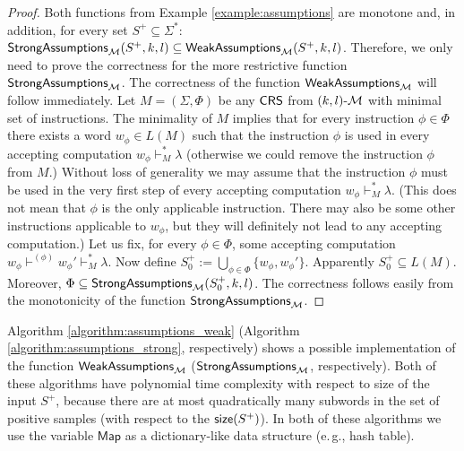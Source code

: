 \begin{proof}
Both functions from Example \ref{example:assumptions} are monotone and, in addition, for every set $S^+ \subseteq \Sigma^*$: $\textup{\sf StrongAssumptions}_{\textup{\sf $\mathcal{M}$}}(S^+,k,l) \subseteq \textup{\sf WeakAssumptions}_{\textup{\sf $\mathcal{M}$}}(S^+,k,l)$. Therefore, we only need to prove the correctness for the more restrictive function $\textup{\sf StrongAssumptions}_{\textup{\sf $\mathcal{M}$}}$. The correctness of the function $\textup{\sf WeakAssumptions}_{\textup{\sf $\mathcal{M}$}}$ will follow immediately. Let $M = (\Sigma, \Phi)$ be any $\textup{\sf CRS\/}$ from $\textup{\sf $(k,l)$-\textup{\sf $\mathcal{M}$}}$ with minimal set of instructions. The minimality of $M$ implies that for every instruction $\phi \in \Phi$ there exists a word $w_{\phi} \in L(M)$ such that the instruction $\phi$ is used in every accepting computation $w_{\phi} \vdash_M^* \lambda$ (otherwise we could remove the instruction $\phi$ from $M$.) Without loss of generality we may assume that the instruction $\phi$ must be used in the very first step of every accepting computation $w_{\phi} \vdash_M^* \lambda$. (This does not mean that $\phi$ is the only applicable instruction. There may also be some other instructions applicable to $w_{\phi}$, but they will definitely not lead to any accepting computation.) Let us fix, for every $\phi \in \Phi$, some accepting computation $w_{\phi} \vdash^{(\phi)} w_{\phi}' \vdash_M^* \lambda$. Now define $S_0^+ := \bigcup_{\phi \in \Phi} \{ w_{\phi}, w_{\phi}' \}$. Apparently $S_0^+ \subseteq L(M)$. Moreover, $\Phi \subseteq \textup{\sf StrongAssumptions}_{\textup{\sf $\mathcal{M}$}}(S_0^+, k, l)$. The correctness follows easily from the monotonicity of the function $\textup{\sf StrongAssumptions}_{\textup{\sf $\mathcal{M}$}}$.
\end{proof}

Algorithm \ref{algorithm:assumptions_weak} (Algorithm \ref{algorithm:assumptions_strong}, respectively) shows a possible implementation of the function $\textup{\sf WeakAssumptions}_{\textup{\sf $\mathcal{M}$}}$ ($\textup{\sf StrongAssumptions}_{\textup{\sf $\mathcal{M}$}}$, respectively). Both of these algorithms have polynomial time complexity with respect to size of the input $S^+$, because there are at most quadratically many subwords in the set of positive samples (with respect to the $\textup{\sf size}(S^+)$). In both of these algorithms we use the variable $\mathsf{Map}$ as a dictionary-like data structure (e.\,g., hash table).

